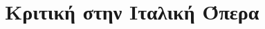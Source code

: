 \documentclass[a4paper, 12pt]{book}
\begin{document}
    \frontmatter
    
        \tableofcontents
        
    \mainmatter

        \part{Κριτική στην Ιταλική Όπερα}
        

    \backmatter

\end{document}

